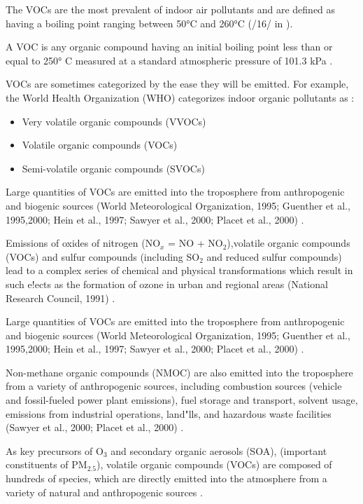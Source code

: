 \documentclass[10pt]{article}
\begin{document}
The VOCs are the most prevalent of indoor air pollutants and are defined as having a boiling point ranging between 50°C and 260°C (/16/ in  \cite{Rumchev2007}).

A VOC is any organic compound having an initial boiling point less than or equal to 250° C measured at a standard atmospheric pressure of 101.3 kPa \cite{EPA2017}.

VOCs are sometimes categorized by the ease they will be emitted. For example, the World Health Organization (WHO) categorizes indoor organic pollutants as \cite{EPA2017}:

\begin{itemize}
    \item Very volatile organic compounds (VVOCs)
    \item Volatile organic compounds (VOCs)
    \item Semi-volatile organic compounds (SVOCs)
\end{itemize}

Large quantities of VOCs are emitted into the troposphere from anthropogenic and biogenic sources (World Meteorological Organization, 1995; Guenther et al., 1995,2000; Hein et al., 1997; Sawyer et al., 2000; Placet et al., 2000) \cite{Atkinson2000}.

Emissions of oxides of nitrogen (NO$_{x}$ = NO + NO$_{2}$),volatile organic compounds (VOCs) and sulfur compounds (including SO$_{2}$ and reduced sulfur compounds) lead to a complex series of chemical and physical transformations which result in such e!ects as the formation of ozone in urban and regional areas (National Research Council, 1991) \cite{Atkinson2000}.

Large quantities of VOCs are emitted into the troposphere from anthropogenic and biogenic sources (World Meteorological Organization, 1995; Guenther et al., 1995,2000; Hein et al., 1997; Sawyer et al., 2000; Placet et al., 2000) \cite{Atkinson2000}.

Non-methane organic compounds (NMOC) are also emitted into the troposphere from a variety of anthropogenic sources, including combustion sources (vehicle and fossil-fueled power plant emissions), fuel storage and transport, solvent usage, emissions from industrial operations, land"lls, and hazardous waste facilities (Sawyer et al., 2000; Placet et al., 2000) \cite{Atkinson2000}.

As key precursors of O$_{3}$ and secondary organic aerosols (SOA), (important constituents of PM$_{2.5}$), volatile organic compounds (VOCs) are composed of hundreds of species, which are directly emitted into the atmosphere from a variety of natural and anthropogenic sources \cite{Guo2017}.
\end{document}
